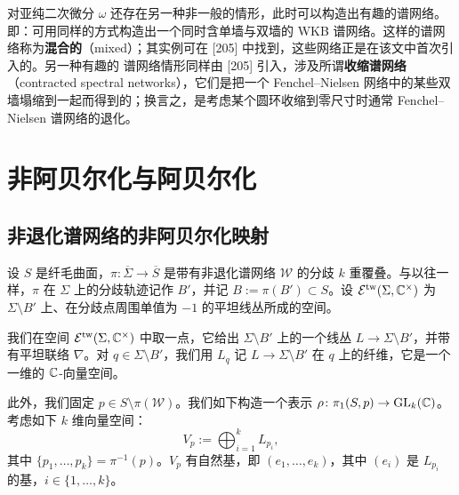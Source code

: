 \begin{remark}[14.3]
对亚纯二次微分 $\omega$ 还存在另一种非一般的情形，此时可以构造出有趣的谱网络。即：可用同样的方式构造出一个同时含单墙与双墙的 WKB 谱网络。这样的谱网络称为\textbf{混合的}（mixed）；其实例可在 [205] 中找到，这些网络正是在该文中首次引入的。另一种有趣的%
谱网络情形同样由 [205] 引入，涉及所谓\textbf{收缩谱网络}（contracted spectral networks），它们是把一个 Fenchel–Nielsen 网络中的某些双墙塌缩到一起而得到的；换言之，是考虑某个圆环收缩到零尺寸时通常 Fenchel–Nielsen 谱网络的退化。
\end{remark}


\chapter{非阿贝尔化与阿贝尔化}


\section{非退化谱网络的非阿贝尔化映射}

设 $S$ 是纤毛曲面，$\pi\colon\overline{\Sigma}\to\overline{S}$ 是带有非退化谱网络 $\mathcal{W}$ 的分歧 $k$ 重覆叠。与以往一样，$\pi$ 在 $\Sigma$ 上的分歧轨迹记作 $B'$，并记 $B:=\pi(B')\subset S$。设 $\mathcal{E}^{\mathrm{tw}}(\Sigma,\mathbb{C}^\times)$ 为 $\Sigma\setminus B'$ 上、在分歧点周围单值为 $-1$ 的平坦线丛所成的空间。

我们在空间 $\mathcal{E}^{\mathrm{tw}}(\Sigma,\mathbb{C}^\times)$ 中取一点，它给出 $\Sigma\setminus B'$ 上的一个线丛 $L\to\Sigma\setminus B'$，并带有平坦联络 $\nabla$。对 $q\in\Sigma\setminus B'$，我们用 $L_q$ 记 $L\to\Sigma\setminus B'$ 在 $q$ 上的纤维，它是一个一维的 $\mathbb{C}$-向量空间。

此外，我们固定 $p\in S\setminus\pi(\mathcal{W})$。我们如下构造一个表示 $\rho\colon\pi_1(S,p)\to\operatorname{GL}_k(\mathbb{C})$。考虑如下 $k$ 维向量空间：
\[
V_p:=\bigoplus_{i=1}^{k}L_{p_i} ,
\]
其中 $\{p_1,\dots,p_k\}=\pi^{-1}(p)$。$V_p$ 有自然基，即 $(e_1,\dots,e_k)$，其中 $(e_i)$ 是 $L_{p_i}$ 的基，$i\in\{1,\dots,k\}$。

